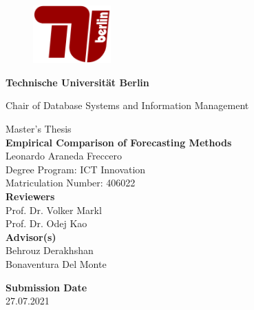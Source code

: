 \thispagestyle{empty}
\begin{center}

    \begin{figure}[t]
        \centering
        \includegraphics[width=3cm]{./img/TU-Berlin-Logo.pdf}%
    \end{figure}

    {\LARGE \textbf{Technische Universit\"at Berlin}}

    \vspace{0.5cm}

    {\large Chair of Database Systems and Information Management\\[1.6mm]}


    \vspace{2.0cm}

    {\LARGE Master's Thesis}\\

    \vspace{2.5cm}
    {\LARGE \textbf{Empirical Comparison of Forecasting Methods}}\\
    \vspace{1.0cm}
    Leonardo Araneda Freccero \\
    Degree Program: ICT Innovation\\
    Matriculation Number: 406022\\

    \vspace*{2.5cm}
    \textbf{Reviewers}\\
    Prof. Dr. Volker Markl\\
    Prof. Dr. Odej Kao\\
    \vspace*{0.5cm}
    \textbf{Advisor(s)}\\
    Behrouz Derakhshan\\
    Bonaventura Del Monte\\
    \vspace{0.5 cm}

    \textbf{Submission Date}\\
    27.07.2021\\ %
\end{center}

